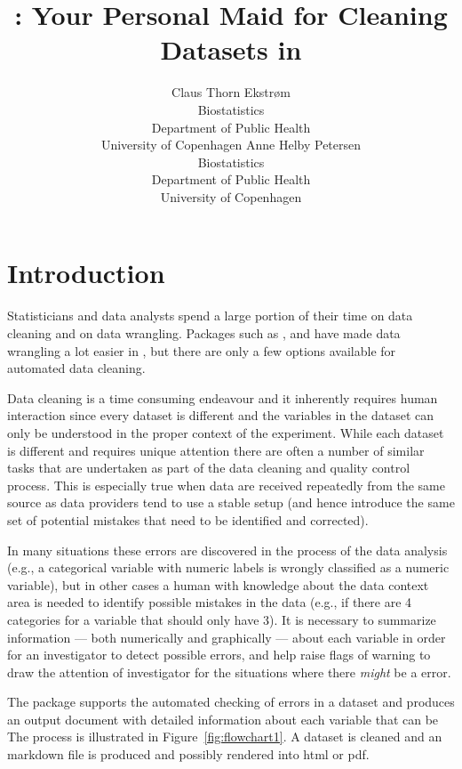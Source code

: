\documentclass[article]{jss}
\author{Claus Thorn Ekstr\o m\\Biostatistics\\Department of Public
  Health\\University of Copenhagen \And
        Anne Helby Petersen\\Biostatistics\\Department of Public
  Health\\University of Copenhagen}
\title{\pkg{cleanR}: Your Personal Maid for Cleaning Datasets in \proglang{R}}
\begin{document}
\section{Introduction}
Statisticians and data analysts spend a large portion of their time on
data cleaning and on data wrangling. Packages such as
, and  have made data wrangling a lot easier in
, but there are only a few options available for automated data
cleaning.

Data cleaning is a time consuming endeavour and it inherently requires
human interaction since every dataset is different and the variables
in the dataset can only be understood in the proper context of the
experiment. While each dataset is different and requires unique
attention there are often a number of similar tasks that are
undertaken as part of the data cleaning and quality control
process. This is especially true when data are received repeatedly
from the same source as data providers tend to use a stable setup (and
hence introduce the same set of potential mistakes that need to be
identified and corrected).

In many situations these errors are discovered in the process of the
data analysis (e.g., a categorical variable with numeric labels is
wrongly classified as a numeric variable), but in other cases a human
with knowledge about the data context area is needed to identify
possible mistakes in the data (e.g., if there are 4 categories for a
variable that should only have 3).  It is necessary to summarize
information --- both numerically and graphically --- about each
variable in order for an investigator to detect possible errors, and
help raise flags of warning to draw the attention of investigator for
the situations where there \emph{might} be a error.

The  package supports the automated checking of errors in
a dataset and produces an output document with detailed information
about each variable that can be
The process is illustrated in Figure~\ref{fig:flowchart1}. A dataset
is cleaned and an  markdown file is produced and possibly
rendered into html or pdf.
\end{document}
